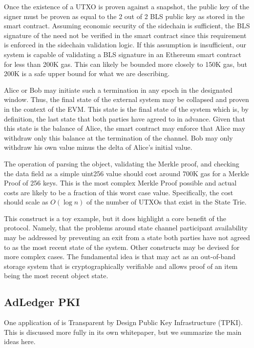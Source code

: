 Once the existence of a UTXO is proven against a snapshot, the public
key of the signer must be proven as equal to the 2 out of 2 BLS public
key as stored in the smart contract.
Assuming economic security of the sidechain is sufficient, the BLS
signature of the \DataStore{} need not be verified in the smart contract
since this requirement is enforced in the sidechain validation logic.
If this assumption is insufficient, our system is capable of validating
a BLS signature in an Ethereum smart contract for less than 200K gas.
This can likely be bounded more closely to 150K gas, but 200K is a safe
upper bound for what we are describing.

Alice or Bob may initiate such a termination in any epoch in the
designated window.
Thus, the final state of the external system may be collapsed and
proven in the context of the EVM.
This state is the final state of the system which is, by definition,
the last state that both parties have agreed to in advance.
Given that this state is the balance of Alice, the smart contract may
enforce that Alice may withdraw only this balance at the termination of
the channel.
Bob may only withdraw his own value minus the delta of Alice’s initial
value.

The operation of parsing the object, validating the Merkle proof, and
checking the data field as a simple uint256 value should cost around
700K gas for a Merkle Proof of 256 keys.
This is the most complex Merkle Proof possible and actual costs are
likely to be a fraction of this worst case value.
Specifically, the cost should scale as $O(\log n)$ of the number of UTXOs
that exist in the State Trie.

This construct is a toy example, but it does highlight a core benefit
of the protocol.
Namely, that the problems around state channel participant availability
may be addressed by preventing an exit from a state both parties have
not agreed to as the most recent state of the system.
Other constructs may be devised for more complex cases.
The fundamental idea is that \LayerTwoLong{} may act as an out-of-band
storage system that is cryptographically verifiable and allows proof of
an item being the most recent object state.

\subsection{AdLedger PKI}

One application of \LayerTwoLong{} is Transparent by Design Public Key
Infrastructure (TPKI).
This is discussed more fully in its own whitepaper, but we summarize
the main ideas here.


